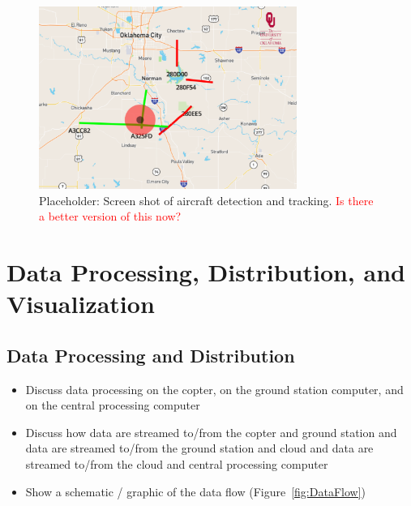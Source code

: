 \documentclass[sensors,review,submit,moreauthors,pdftex,10pt,a4paper]{mdpi}
\theoremstyle{mdpi}
\newcounter{ex}
\newcounter{re}
\theoremstyle{mdpidefinition}
\begin{document}
\begin{figure}
\centering
\includegraphics[angle=0, width=0.75\textwidth]{figures/kess5.pdf}
\caption{\label{fig:ADSBScreen} Placeholder: Screen shot of aircraft detection and tracking. \textcolor{red}{Is there a better version of this now?}}
\end{figure}

\section{Data Processing, Distribution, and Visualization}

\subsection{Data Processing and Distribution}
\begin{itemize}[leftmargin=*,labelsep=4mm]
\color{blue}
\item	Discuss data processing on the copter, on the ground station computer, and on the central processing computer
\item	Discuss how data are streamed to/from the copter and ground station and data are streamed to/from the ground station and cloud and data are streamed to/from the cloud and central processing computer
\item	Show a schematic / graphic of the data flow (Figure~\ref{fig:DataFlow})
\end{itemize}
\end{document}
